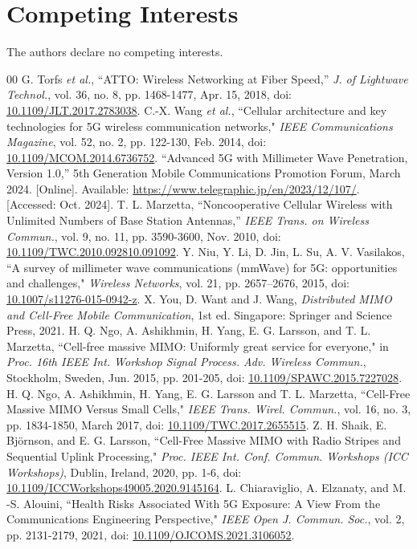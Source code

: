 \documentclass{IEEEtran}
\newcommand*{\doi}[1]{\href{http://dx.doi.org/#1}{#1}}
\begin{document}
\section*{Competing Interests}
The authors declare no competing interests.

\begin{thebibliography}{00}
 G. Torfs \textit{et al.}, ``ATTO: Wireless Networking at Fiber Speed,'' \textit{J. of Lightwave Technol.}, vol. 36, no. 8, pp. 1468-1477, Apr. 15, 2018, doi: \doi{10.1109/JLT.2017.2783038}.
 C.-X. Wang \textit{et al.}, ``Cellular architecture and key technologies for 5G wireless communication networks," \textit{IEEE Communications Magazine}, vol. 52, no. 2, pp. 122-130, Feb. 2014, doi: \doi{10.1109/MCOM.2014.6736752}.
  ``Advanced 5G with Millimeter Wave Penetration, Version 1.0,'' 5th Generation Mobile Communications Promotion Forum, March 2024. [Online]. Available: \url{https://www.telegraphic.jp/en/2023/12/107/}. [Accessed: Oct. 2024].
 T. L. Marzetta, ``Noncooperative Cellular Wireless with Unlimited Numbers of Base Station Antennas,'' \textit{IEEE Trans. on Wireless Commun.}, vol. 9, no. 11, pp. 3590-3600, Nov. 2010, doi: \doi{10.1109/TWC.2010.092810.091092}.
 Y. Niu, Y. Li, D. Jin, L. Su, A. V. Vasilakos, ``A survey of millimeter wave communications (mmWave) for 5G: opportunities and challenges," \textit{Wireless Networks}, vol. 21, pp. 2657–2676, 2015, doi: \doi{10.1007/s11276-015-0942-z}.
 X. You, D. Want and J. Wang, \textit{Distributed MIMO and Cell-Free Mobile Communication}, 1st ed. Singapore: Springer and Science Press, 2021.
 H. Q. Ngo, A. Ashikhmin, H. Yang, E. G. Larsson, and T. L. Marzetta, ``Cell-free massive MIMO: Uniformly great service for everyone," in \textit{Proc. 16th IEEE Int. Workshop Signal Process. Adv. Wireless Commun.}, Stockholm, Sweden, Jun. 2015, pp. 201-205, doi: \doi{10.1109/SPAWC.2015.7227028}.
 H. Q. Ngo, A. Ashikhmin, H. Yang, E. G. Larsson and T. L. Marzetta, ``Cell-Free Massive MIMO Versus Small Cells," \textit{IEEE Trans. Wirel. Commun.}, vol. 16, no. 3, pp. 1834-1850, March 2017, doi: \doi{10.1109/TWC.2017.2655515}.
 Z. H. Shaik, E. Björnson, and E. G. Larsson, ``Cell-Free Massive MIMO with Radio Stripes and Sequential Uplink Processing," \textit{Proc. IEEE Int. Conf. Commun. Workshops (ICC Workshops)}, Dublin, Ireland, 2020, pp. 1-6, doi: \doi{10.1109/ICCWorkshops49005.2020.9145164}.
  L. Chiaraviglio, A. Elzanaty, and M. -S. Alouini, ``Health Risks Associated With 5G Exposure: A View From the Communications Engineering Perspective," \textit{IEEE Open J. Commun. Soc.}, vol. 2, pp. 2131-2179, 2021, doi: \doi{10.1109/OJCOMS.2021.3106052}.

\end{thebibliography}
\end{document}
